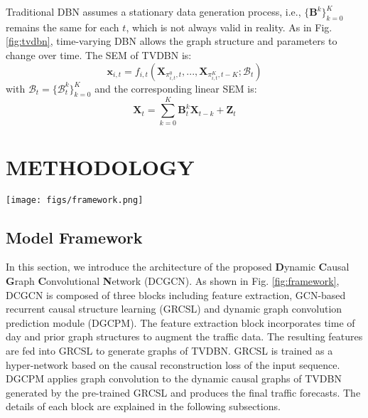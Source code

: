 \documentclass[letterpaper, 10 pt, conference]{ieeeconf}
\begin{document}
Traditional DBN assumes a stationary data generation process, i.e., $\{\mathbf{B}^k\}_{k=0}^K$ remains the same for each $t$, which is not always valid in reality. As in Fig. \ref{fig:tvdbn}, time-varying DBN allows the graph structure and parameters to change over time. The SEM of TVDBN is:
\begin{equation}
        \mathbf{x}_{i,t}=f_{i,t}(\mathbf{X}_{\pi_{i,t}^0, t},...,\mathbf{X}_{\pi_{i,t}^K, t-K};\mathcal{B}_t)
\end{equation}
with $\mathcal{B}_t=\{\mathcal{B}^k_t\}_{k=0}^K$ and the corresponding linear SEM is:
\begin{equation}
        \label{eq:li_sem}
        \mathbf{X}_t=\sum_{k=0}^K\mathbf{B}^k_t\mathbf{X}_{t-k}+\mathbf{Z}_t
\end{equation}

\section{METHODOLOGY}
\begin{figure*}[thbp]
        \centering
        \texttt{[image: figs/framework.png]}
        \vspace{-10pt}
        \caption{Architecture of the DCGCN. (a) shows the overall framework of the DCGCN. (b) shows the details of the pre-trained causal learning hyper-network, including the feature extraction block to incorporate prior information and the GCN-based recurrent causal structure learning (GRCSL) module. (c) shows the details of the dynamic graph convolution prediction module (DGCPM) used to generate traffic forecasts. }
        \label{fig:framework}
\end{figure*}

\subsection{Model Framework}
In this section, we introduce the architecture of the proposed \textbf{D}ynamic \textbf{C}ausal \textbf{G}raph \textbf{C}onvolutional \textbf{N}etwork (DCGCN). As shown in Fig. \ref{fig:framework}, DCGCN is composed of three blocks including feature extraction, GCN-based recurrent causal structure learning (GRCSL) and dynamic graph convolution prediction module (DGCPM). The feature extraction block incorporates time of day and prior graph structures to augment the traffic data. The resulting features are fed into GRCSL to generate graphs of TVDBN. GRCSL is trained as a hyper-network based on the causal reconstruction loss of the input sequence. DGCPM applies graph convolution to the dynamic causal graphs of TVDBN generated by the pre-trained GRCSL and produces the final traffic forecasts. The details of each block are explained in the following subsections.
\end{document}
